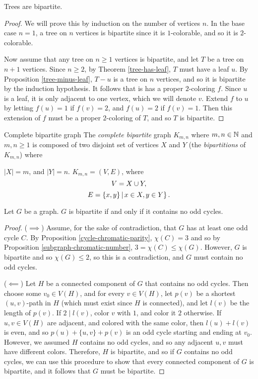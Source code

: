 \begin{prop}
    Trees are bipartite.
\end{prop}

\begin{proof}
    We will prove this by induction on the number of vertices $n$. In the base case $n=1$, a tree on $n$ vertices is bipartite since it is $1$-colorable, and so it is $2$-colorable.

    Now assume that any tree on $n \geq 1$ vertices is bipartite, and let $T$ be a tree on $n+1$ vertices. Since $n \geq 2$, by Theorem \ref{tree-has-leaf}, $T$ must have a leaf $u$. By Proposition \ref{tree-minus-leaf}, $T - u$ is a tree on $n$ vertices, and so it is bipartite by the induction hypothesis. It follows that is has a proper $2$-coloring $f$. Since $u$ is a leaf, it is only adjacent to one vertex, which we will denote $v$. Extend $f$ to $u$ by letting $f(u) = 1$ if $f(v) = 2$, and $f(u) = 2$ if $f(v) = 1$. Then this extension of $f$ must be a proper $2$-coloring of $T$, and so $T$ is bipartite.
\end{proof}

\begin{defn}Complete bipartite graph\proofbreak
    The \emph{complete bipartite} graph $K_{m,n}$ where $m,n \in \mathbb{N}$ and $m,n \geq 1$ is composed of two disjoint set of vertices $X$ and $Y$ (the \emph{bipartitions} of $K_{m,n}$) where \item $|X| = m$, and $|Y| = n$. $K_{m,n} = (V, E)$, where
    \[V = X \cup Y,\]
    \[E = \left\{x, y\} \,\middle|\, x \in X, y \in Y \right\}.\]
\end{defn}

\begin{thm}
    Let $G$ be a graph. $G$ is bipartite if and only if it contains no odd cycles.
\end{thm}

\begin{proof}\proofbreak
    ($\implies$) Assume, for the sake of contradiction, that $G$ has at least one odd cycle $C$. By Proposition \ref{cycle-chromatic-parity}, $\chi(C) = 3$ and so by Proposition \ref{subgraph-chromatic-number}, $3 = \chi(C) \leq \chi(G)$. However, $G$ is bipartite and so $\chi(G) \leq 2$, so this is a contradiction, and $G$ must contain no odd cycles.

    ($\impliedby$) Let $H$ be a connected component of $G$ that contains no odd cycles. Then choose some $v_0 \in V(H)$, and for every $v \in V(H)$, let $p(v)$ be a shortest $(u,v)$-path in $H$ (which must exist since $H$ is connected), and let $l(v)$ be the length of $p(v)$. If $2 \mid l(v)$, color $v$ with $1$, and color it $2$ otherwise. If $u, v \in V(H)$ are adjacent, and colored with the same color, then $l(u) + l(v)$ is even, and so $p(u) + \{u, v\} + p(v)$ is an odd cycle starting and ending at $v_0$. However, we assumed $H$ contains no odd cycles, and so any adjacent $u,v$ must have different colors. Therefore, $H$ is bipartite, and so if $G$ contains no odd cycles, we can use this procedure to show that every connected component of $G$ is bipartite, and it follows that $G$ must be bipartite.
\end{proof}
